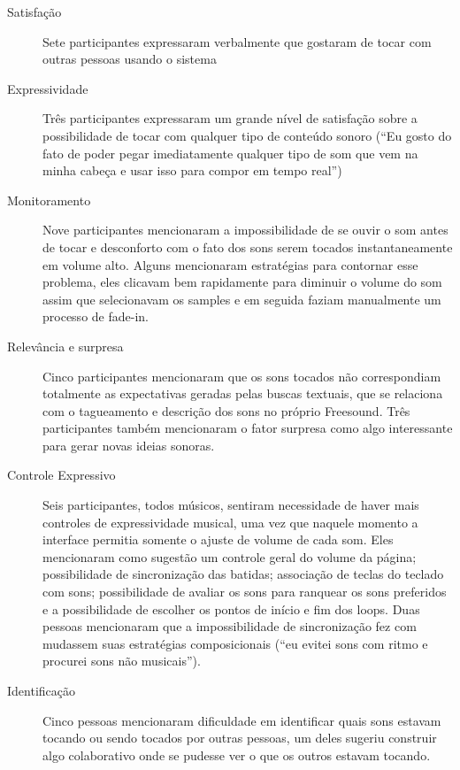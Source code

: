 \begin{description}
 \item[Satisfação] Sete participantes expressaram verbalmente que gostaram de tocar com outras pessoas usando o sistema

  \item[Expressividade] Três participantes expressaram um grande nível de satisfação sobre a possibilidade de tocar com qualquer tipo de conteúdo sonoro (``Eu gosto do fato de poder pegar imediatamente qualquer tipo de som que vem na minha cabeça e usar isso para compor em tempo real'')

 \item[Monitoramento] Nove participantes mencionaram a impossibilidade de se ouvir o som antes de tocar e desconforto com o fato dos sons serem tocados instantaneamente em volume alto. Alguns mencionaram estratégias para contornar esse problema, eles clicavam bem rapidamente para diminuir o volume do som assim que selecionavam os samples e em seguida faziam manualmente um processo de fade-in.

 \item[Relevância e surpresa] Cinco participantes mencionaram que os sons tocados não correspondiam totalmente as expectativas geradas pelas buscas textuais, que se relaciona com o tagueamento e descrição dos sons no próprio Freesound. Três participantes também mencionaram o fator surpresa como algo interessante para gerar novas ideias sonoras.

 \item[Controle Expressivo] Seis participantes, todos músicos, sentiram necessidade de haver mais controles de expressividade musical, uma vez que naquele momento a interface permitia somente o ajuste de volume de cada som. Eles mencionaram como sugestão um controle geral do volume da página; possibilidade de sincronização das batidas; associação de teclas do teclado com sons; possibilidade de avaliar os sons para ranquear os sons preferidos e a possibilidade de escolher os pontos de início e fim dos loops. Duas pessoas mencionaram que a impossibilidade de sincronização fez com mudassem suas estratégias composicionais (``eu evitei sons com ritmo e procurei sons não musicais'').

  \item[Identificação] Cinco pessoas mencionaram dificuldade em identificar quais sons estavam tocando ou sendo tocados por outras pessoas, um deles sugeriu construir algo colaborativo onde se pudesse ver o que os outros estavam tocando.


\end{description}
